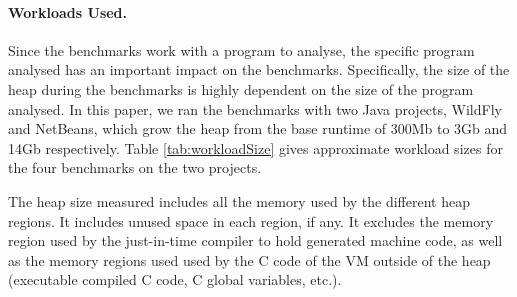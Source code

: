 \documentclass[sigplan,10pt,review,anonymous]{acmart}\settopmatter{printfolios=true,printccs=false,printacmref=false}
\newcommand{\todo}[1]{\color{orange}\fbox{\bfseries\sffamily\scriptsize TODO:}{\sf\small$\blacktriangleright$\textit{#1}$\blacktriangleleft$}\color{black}}
\def\ie{\emph{i.e., }}
\begin{document}



\paragraph{Workloads Used.} Since the benchmarks work with a program to analyse, the specific program analysed has an important impact on the benchmarks. Specifically, the size of the heap during the benchmarks is highly dependent on the size of the program analysed. In this paper, we ran the benchmarks with two Java projects, WildFly and NetBeans, which grow the heap from the base runtime of 300Mb to 3Gb and 14Gb respectively. Table \ref{tab:workloadSize} gives approximate workload sizes for the four benchmarks on the two projects. 

The heap size measured includes all the memory used by the different heap regions. It includes unused space in each region, if any. It excludes the memory region used by the just-in-time compiler to hold generated machine code, as well as the memory regions used used by the C code of the VM outside of the heap (executable compiled C code, C global variables, etc.).
\end{document}
